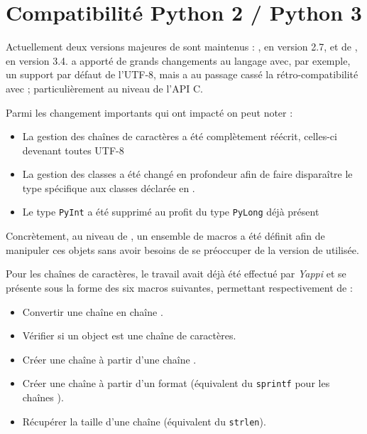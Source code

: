 \chapter{Compatibilité Python 2 / Python 3}
  \label{app:compat-py3}
Actuellement deux versions majeures de \Python sont maintenus : , en version 2.7, et de , en version 3.4.  a apporté de grands changements au langage avec, par exemple, un support par défaut de l'UTF-8, mais a au passage cassé la rétro-compatibilité avec  ; particulièrement au niveau de l'API C.

Parmi les changement importants qui ont impacté \Blackfire on peut noter :
\begin{itemize}
\item La gestion des chaînes de caractères a été complètement réécrit, celles-ci devenant toutes UTF-8
\item La gestion des classes a été changé en profondeur afin de faire disparaître le type spécifique aux classes déclarée en \Python.
\item Le type \verb|PyInt| a été supprimé au profit du type \verb|PyLong| déjà présent
\end{itemize}

Concrètement, au niveau de \Blackfire, un ensemble de macros a été définit afin de manipuler ces objets sans avoir besoins de se préoccuper de la version de \Python utilisée.

Pour les chaînes de caractères, le travail avait déjà été effectué par \emph{Yappi} et se présente sous la forme des six macros suivantes, permettant respectivement de :
\begin{itemize}
\item Convertir une chaîne \Python en chaîne \C.
\item Vérifier si un object \Python est une chaîne de caractères.
\item Créer une chaîne \Python à partir d'une chaîne \C.
\item Créer une chaîne \Python à partir d'un format (équivalent du \verb|sprintf| pour les chaînes \C).
\item Récupérer la taille d'une chaîne \Python (équivalent du \verb|strlen|).
\end{itemize}


